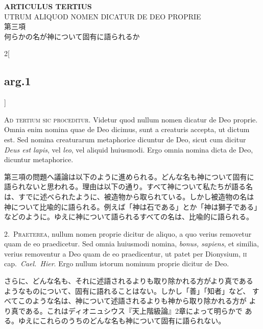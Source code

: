 \documentclass[paper=a4paper,fontsize=10pt,jafontsize=9pt,titlepage]{jlreq}
\begin{document}
\newpage
{}

\begin{center}
{\Large {\bfseries ARTICULUS TERTIUS}}\\
{\large UTRUM ALIQUOD NOMEN DICATUR DE DEO PROPRIE}\\
{\large 第三項\\何らかの名が神について固有に語られるか} 
\end{center}

{}
\setcounter{section}{3}
\setcounter{subsection}{0}

\begin{paracol}{2}[\subsection{arg.1}]

{\scshape Ad tertium sic proceditur}. Videtur quod nullum nomen dicatur de
Deo proprie. Omnia enim nomina quae de Deo dicimus, sunt a creaturis
accepta, ut dictum est. Sed nomina creaturarum metaphorice dicuntur de
Deo, sicut cum dicitur {\itshape Deus est lapis}, vel {\itshape leo}, vel
aliquid huiusmodi. Ergo omnia nomina dicta de Deo, dicuntur
metaphorice.

\switchcolumn

第三項の問題へ議論は以下のように進められる。どんな名も神について固有に
語られないと思われる。理由は以下の通り。すべて神について私たちが語る名
は、すでに述べられたように、被造物から取られている。しかし被造物の名は
神について比喩的に語られる。例えば「神は石である」とか「神は獅子である」
などのように。ゆえに神について語られるすべての名は、比喩的に語られる。


2.~{\scshape Praeterea}, nullum nomen proprie dicitur de aliquo, a quo
verius removetur quam de eo praedicetur. Sed omnia huiusmodi nomina,
{\itshape bonus, sapiens}, et similia, verius removentur a Deo quam de eo
praedicentur, ut patet per Dionysium, {\scshape ii} cap.\ {\itshape Cael.\
Hier}. Ergo nullum istorum nominum proprie dicitur de Deo.

\switchcolumn

さらに、どんな名も、それに述語されるよりも取り除かれる方がより真である
ようなものについて、固有に語れることはない。しかし「善」「知者」など、
すべてこのような名は、神について述語されるよりも神から取り除かれる方が
より真である。これはディオニュシウス『天上階級論』2章によって明らかで
ある。ゆえにこれらのうちのどんな名も神について固有に語られない。


\end{paracol}
\end{document}
